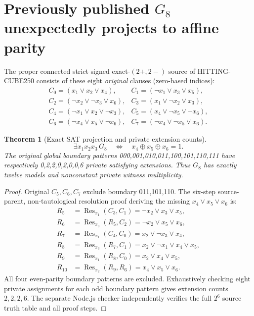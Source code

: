 \documentclass[10pt]{article}
\newtheorem{theorem}{Theorem}
\begin{document}
\section{Previously published $G_8$ unexpectedly projects to affine parity}
The proper connected strict signed exact-$(2+,2-)$ source of HITTING-CUBE250 consists of these eight \emph{original} clauses (zero-based indices):
\[
\begin{array}{ll}
C_0=(x_1\vee x_2\vee x_4),&C_1=(\neg x_1\vee x_3\vee x_5),\\
C_2=(\neg x_2\vee\neg x_3\vee x_6),&C_3=(x_1\vee\neg x_2\vee x_3),\\
C_4=(\neg x_1\vee x_2\vee\neg x_3),&C_5=(x_4\vee\neg x_5\vee\neg x_6),\\
C_6=(\neg x_4\vee x_5\vee\neg x_6),&C_7=(\neg x_4\vee\neg x_5\vee x_6).
\end{array}
\]
\begin{theorem}[Exact SAT projection and private extension counts]
\[
\exists x_1x_2x_3\,G_8 \quad\Longleftrightarrow\quad x_4\oplus x_5\oplus x_6=1.
\]
The original global boundary patterns 000,001,010,011,100,101,110,111 have respectively 0,2,2,0,2,0,0,6 private satisfying extensions. Thus $G_8$ has exactly twelve models and \emph{nonconstant} private witness multiplicity.
\end{theorem}
\begin{proof}Original $C_5,C_6,C_7$ exclude boundary 011,101,110. The six-step source-parent, non-tautological resolution proof deriving the missing $x_4\vee x_5\vee x_6$ is:
\[
\begin{aligned}
R_5&=\operatorname{Res}_{x_1}(C_3,C_1)=\neg x_2\vee x_3\vee x_5,\\
R_6&=\operatorname{Res}_{x_3}(R_5,C_2)=\neg x_2\vee x_5\vee x_6,\\
R_7&=\operatorname{Res}_{x_1}(C_4,C_0)=x_2\vee\neg x_3\vee x_4,\\
R_8&=\operatorname{Res}_{x_3}(R_7,C_1)=x_2\vee\neg x_1\vee x_4\vee x_5,\\
R_9&=\operatorname{Res}_{x_1}(R_8,C_0)=x_2\vee x_4\vee x_5,\\
R_{10}&=\operatorname{Res}_{x_2}(R_9,R_6)=x_4\vee x_5\vee x_6.
\end{aligned}
\]
All four even-parity boundary patterns are excluded. Exhaustively checking eight private assignments for each odd boundary pattern gives extension counts $2,2,2,6$. The separate Node.js checker independently verifies the full $2^6$ source truth table and all proof steps.\end{proof}
\end{document}
